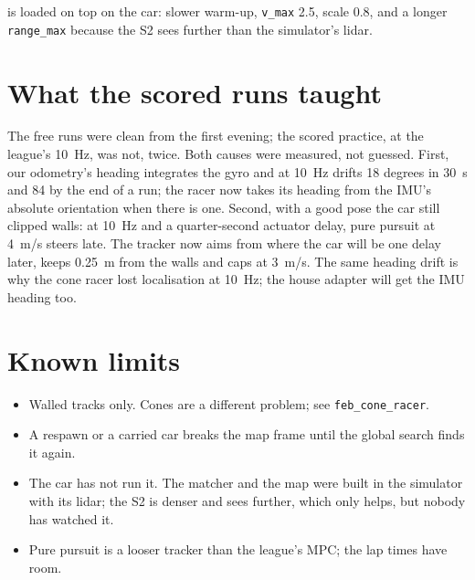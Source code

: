 \documentclass[11pt,a4paper]{article}
\begin{document}
\medskip
{} is loaded on top on the car: slower warm-up, \texttt{v\_max} 2.5, scale 0.8, and a
longer \texttt{range\_max} because the S2 sees further than the simulator's lidar.

\section{What the scored runs taught}

The free runs were clean from the first evening; the scored practice, at the league's 10~Hz, was not,
twice. Both causes were measured, not guessed. First, our odometry's heading integrates the gyro and at
10~Hz drifts 18 degrees in 30~s and 84 by the end of a run; the racer now takes its heading from the
IMU's absolute orientation when there is one. Second, with a good pose the car still clipped walls:
at 10~Hz and a quarter-second actuator delay, pure pursuit at 4~m/s steers late. The tracker now
aims from where the car will be one delay later, keeps 0.25~m from the walls and caps at 3~m/s. The
same heading drift is why the cone racer lost localisation at 10~Hz; the house adapter will get the
IMU heading too.

\section{Known limits}

\begin{itemize}
  \item Walled tracks only. Cones are a different problem; see \texttt{feb\_cone\_racer}.
  \item A respawn or a carried car breaks the map frame until the global search finds it again.
  \item The car has not run it. The matcher and the map were built in the simulator with its lidar; the S2 is denser
    and sees further, which only helps, but nobody has watched it.
  \item Pure pursuit is a looser tracker than the league's MPC; the lap times have room.
\end{itemize}
\end{document}
